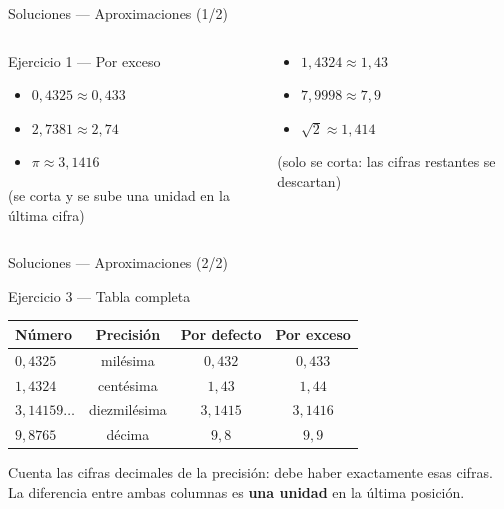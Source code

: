 \documentclass[aspectratio=169]{beamer}
\begin{document}
\begin{frame}{Soluciones — Aproximaciones \textnormal{(1/2)}}
  \mwtopanchoroff
  \begin{columns}[T]
    \begin{exampleblock}{Ejercicio 1 — Por exceso}
      \begin{itemize}
        \item $0{,}4325 \approx 0{,}433$
        \item $2{,}7381 \approx 2{,}74$
        \item $\pi \approx 3{,}1416$
      \end{itemize}
      \small (se corta y se sube una unidad en la última cifra)
    \end{exampleblock}
    \begin{mwextra}
      \begin{itemize}
        \item $1{,}4324 \approx 1{,}43$
        \item $7{,}9998 \approx 7{,}9$
        \item $\sqrt{2} \approx 1{,}414$
      \end{itemize}
      \small (solo se corta: las cifras restantes se descartan)
    \end{mwextra}
  \end{columns}
  \mwtopanchoron
\end{frame}

\begin{frame}{Soluciones — Aproximaciones \textnormal{(2/2)}}
  \mwtopanchoroff
  \begin{block}{Ejercicio 3 — Tabla completa}
    \renewcommand{\arraystretch}{1.25}
    \begin{tabular}{@{} l c c c @{}}
      \toprule
      \textbf{Número} & \textbf{Precisión} & \textbf{Por defecto}
        & \textbf{Por exceso} \\
      \midrule
      $0{,}4325$ & milésima & $0{,}432$ & $0{,}433$ \\
      $1{,}4324$ & centésima & $1{,}43$ & $1{,}44$ \\
      $3{,}14159\dots$ & diezmilésima & $3{,}1415$ & $3{,}1416$ \\
      $9{,}8765$ & décima & $9{,}8$ & $9{,}9$ \\
      \bottomrule
    \end{tabular}
  \end{block}
  \vspace{2pt}
  \begin{mwpasos}
    Cuenta las cifras decimales de la precisión: debe haber exactamente
    esas cifras. La diferencia entre ambas columnas es \textbf{una
    unidad} en la última posición.
  \end{mwpasos}
  \mwtopanchoron
\end{frame}
\end{document}
